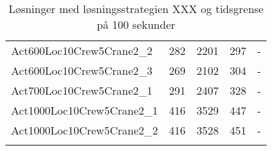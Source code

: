 \begin{center}
\begin{longtable}{ | l | c | c | c | c | }
Act600Loc10Crew5Crane2\_2	&	282	&	2201	&	297	&	-	\\	
Act600Loc10Crew5Crane2\_3	&	269	&	2102	&	304	&	-	\\	
Act700Loc10Crew5Crane2\_1	&	291	&	2407	&	328	&	-	\\	
Act1000Loc10Crew5Crane2\_1	&	416	&	3529	&	447	&	-	\\	
Act1000Loc10Crew5Crane2\_2	&	416	&	3528	&	451	&	-	\\	
\hline		
\caption{Løsninger med løsningsstrategien XXX og tidsgrense på 100 sekunder}										
\label{tab:solutionSSTFAARF100s}								
\end{longtable}				
\end{center}

